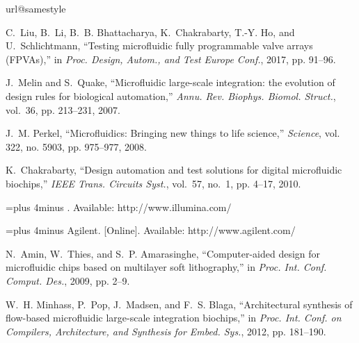 \documentclass[journal,twoside]{IEEEtran}
\begin{document}

\begin{thebibliography}{10}
\providecommand{\url}[1]{#1}
\csname url@samestyle\endcsname
\providecommand{\newblock}{\relax}
\providecommand{\bibinfo}[2]{#2}
\providecommand{\BIBentrySTDinterwordspacing}{\spaceskip=0pt\relax}
\providecommand{\BIBentryALTinterwordstretchfactor}{4}
\providecommand{\BIBentryALTinterwordspacing}{\spaceskip=\fontdimen2\font plus
\BIBentryALTinterwordstretchfactor\fontdimen3\font minus
  \fontdimen4\font\relax}
\providecommand{\BIBforeignlanguage}[2]{{%
\expandafter\ifx\csname l@#1\endcsname\relax
\typeout{** WARNING: IEEEtran.bst: No hyphenation pattern has been}%
\typeout{** loaded for the language `#1'. Using the pattern for}%
\typeout{** the default language instead.}%
\else
\language=\csname l@#1\endcsname
\fi
#2}}
\providecommand{\BIBdecl}{\relax}
\BIBdecl

C.~Liu, B.~Li, B.~B. Bhattacharya, K.~Chakrabarty, T.-Y. Ho, and
  U.~Schlichtmann, ``Testing microfluidic fully programmable valve arrays
  ({FPVAs}),'' in \emph{Proc. Design, Autom., and Test Europe Conf.}, 2017, pp.
  91--96.

J.~Melin and S.~Quake, ``Microfluidic large-scale integration: the evolution of
  design rules for biological automation,'' \emph{Annu. Rev. Biophys. Biomol.
  Struct.}, vol.~36, pp. 213--231, 2007.

J.~M. Perkel, ``Microfluidics: Bringing new things to life science,''
  \emph{Science}, vol. 322, no. 5903, pp. 975--977, 2008.

K.~Chakrabarty, ``Design automation and test solutions for digital microfluidic
  biochips,'' \emph{{IEEE} Trans. Circuits Syst.}, vol.~57, no.~1, pp. 4--17,
  2010.

\BIBentryALTinterwordspacing
 [Online]. Available: \url{http://www.illumina.com/}
\BIBentrySTDinterwordspacing

\BIBentryALTinterwordspacing
{Agilent}. [Online]. Available: \url{http://www.agilent.com/}
\BIBentrySTDinterwordspacing

N.~Amin, W.~Thies, and S.~P. Amarasinghe, ``Computer-aided design for
  microfluidic chips based on multilayer soft lithography,'' in \emph{Proc.
  Int. Conf. Comput. Des.}, 2009, pp. 2--9.

W.~H. Minhass, P.~Pop, J.~Madsen, and F.~S. Blaga, ``Architectural synthesis of
  flow-based microfluidic large-scale integration biochips,'' in \emph{Proc.
  Int. Conf. on Compilers, Architecture, and Synthesis for Embed. Sys.}, 2012,
  pp. 181--190.


\end{thebibliography}
\end{document}
